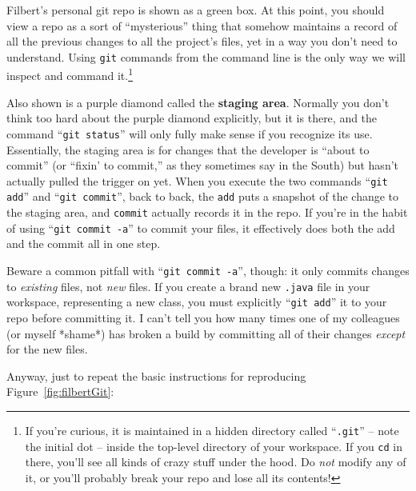 Filbert's personal git repo is shown as a green box. At this point, you should
view a repo as a sort of ``mysterious'' thing that somehow maintains a record
of all the previous changes to all the project's files, yet in a way you don't
need to understand. Using \texttt{git} commands from the command line is the
only way we will inspect and command it.\footnote{If you're curious, it is
maintained in a hidden directory called ``\texttt{.git}'' -- note the initial
dot -- inside the top-level directory of your workspace. If you \texttt{cd} in
there, you'll see all kinds of crazy stuff under the hood. Do \textit{not}
modify any of it, or you'll probably break your repo and lose all its contents!}

Also shown is a purple diamond called the \textbf{staging area}. Normally you
don't think too hard about the purple diamond explicitly, but it is there, and
the command ``\texttt{git status}'' will only fully make sense if you recognize
its use. Essentially, the staging area is for changes that the developer is
``about to commit'' (or ``fixin' to commit,'' as they sometimes say in the
South) but hasn't actually pulled the trigger on yet. When you execute the two
commands ``\texttt{git add}'' and ``\texttt{git commit}'', back to back, the
\texttt{add} puts a snapshot of the change to the staging area, and
\texttt{commit} actually records it in the repo. If you're in the habit of
using ``\texttt{git commit -a}'' to commit your files, it effectively does both
the add and the commit all in one step.

\label{commitPitfall}
Beware a common pitfall with ``\texttt{git commit -a}'', though: it only
commits changes to \textit{existing} files, not \textit{new} files. If you
create a brand new \texttt{.java} file in your workspace, representing a new
class, you must explicitly ``\texttt{git add}'' it to your repo before
committing it. I can't tell you how many times one of my colleagues (or myself
*shame*) has broken a build by committing all of their changes \textit{except}
for the new files.

Anyway, just to repeat the basic instructions for reproducing
Figure~\ref{fig:filbertGit}:

